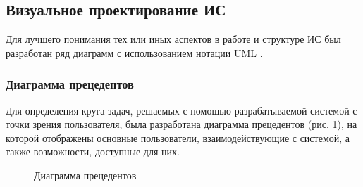 	\subsection{Визуальное проектирование ИС}

		Для лучшего понимания тех или иных аспектов в работе и структуре ИС был разработан ряд диаграмм с использованием нотации UML \cite{Fowler2003}.

		\subsubsection{Диаграмма прецедентов}

			Для определения круга задач, решаемых с помощью разрабатываемой системой с точки зрения пользователя, была разработана диаграмма прецедентов (рис. \ref{img:use_case_diagram}), на которой отображены основные пользователи, взаимодействующие с системой, а также возможности, доступные для них.
			\newline
			\newline
			\begin{figure}[h]
				\caption{Диаграмма прецедентов}
				\label{img:use_case_diagram}
			\end{figure}
			

